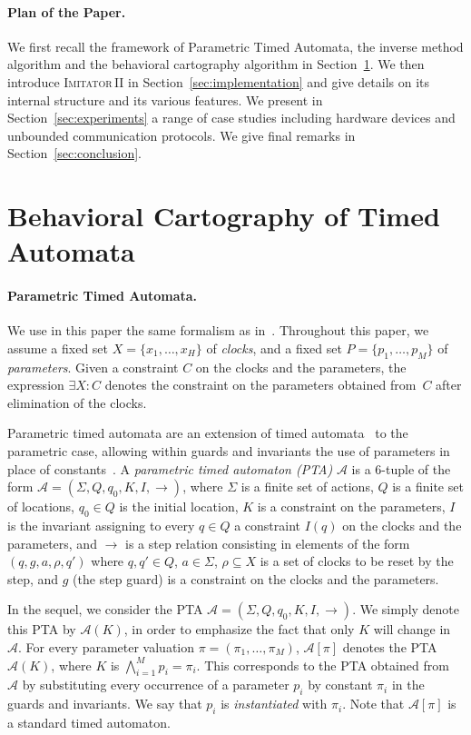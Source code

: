 \documentclass[submission,copyright,creativecommons]{eptcs}
\newcommand{\A}{\mathcal{A}}
\newcommand{\steps}[0]{ {\rightarrow} }
\newcommand{\imitatordeux}{\textsc{Imitator}\,II}
\newcommand{\paragraphe}[1]{\paragraph{#1.}}
\begin{document}
\paragraphe{Plan of the Paper}
We first recall the framework of Parametric Timed Automata,
the inverse method algorithm and
the behavioral cartography algorithm in Section~\ref{sec:preliminaries}.
We then introduce \imitatordeux{} in Section~\ref{sec:implementation} and give details on its internal structure and its various features.
We present in Section~\ref{sec:experiments} a range of case studies including hardware devices and unbounded communication protocols.
We give final remarks in Section~\ref{sec:conclusion}.


\section{Behavioral Cartography of Timed Automata} \label{sec:preliminaries}






\paragraphe{Parametric Timed Automata} \label{ss:pta}


We use in this paper the same formalism as in~\cite{af10}.
Throughout this paper, we assume a fixed set $X = \{x_1, \dots, x_{H} \}$ of \emph{clocks},
and a fixed set $P = \{p_1, \dots, p_{M} \}$  of \emph{parameters}.
Given a constraint $C$ on the clocks and the parameters, the expression $\exists X: C$ denotes the constraint on the parameters obtained from~$C$ after elimination of the clocks.

Parametric timed automata are an extension of timed automata~\cite{ad94} to the parametric case, allowing within guards and invariants the use of parameters in place of constants~\cite{ahv93}.
A {\em parametric timed automaton (PTA)} $\A$ is a $6$-tuple of the form
\mbox{$\A=(\Sigma, Q, q_{0}, K, I, \steps)$},
where
$\Sigma$ is a finite set of actions,
$Q$ is a finite set of locations,
$q_{0} \in Q$ is the initial location,
$K$ is a constraint on the parameters, $I$ is the invariant assigning to every $q\in Q$
a constraint $I(q)$ on the clocks and the parameters, and
$\steps$ is a step relation consisting in elements of the form $(q,g,a,\rho,q')$  where
$q,q'\in Q$, $a\in\Sigma$, $\rho\subseteq X$ is a set of clocks to be reset by the step, and
$g$ (the step guard) is a constraint on the clocks and the parameters.

In the sequel, we consider the PTA $\A = (\Sigma, Q, q_{0}, K, I, \steps)$.
We simply denote this PTA by $\A(K)$, in order to emphasize the fact that only $K$ will change in $\A$.
For every parameter valuation \(\pi = (\pi_1, \dots, \pi_{M})\),
\(\A[\pi]\) denotes the PTA
\(\A(K)\),
where $K$ is $\bigwedge_{i = 1}^M p_i = \pi_i$.
This corresponds to the PTA obtained from~$\A$ by substituting every occurrence of a parameter \(p_i\) by constant \(\pi_i\) in the guards and invariants.
We say that $p_i$ is \emph{instantiated} with $\pi_i$.
Note that $\A[\pi]$ is a standard timed automaton.
\end{document}
